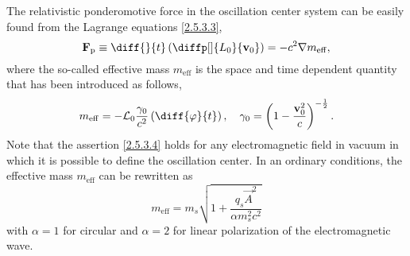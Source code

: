 The relativistic ponderomotive force in the oscillation center system can be easily found from the Lagrange equations \ref{2.5.3.3},
\begin{equation}
\vec{F}_{\mathrm{p}} \equiv \diff{}{t} \left( \diffp[]{L_0}{\vec{v}_0} \right) = -c^2 \grad{m_{\mathrm{eff}}},
\end{equation}
where the so-called effective mass $ m_{\mathrm{eff}} $ is the space and time dependent quantity that has been introduced as follows,
\begin{equation}
\label{2.5.3.4}
m_{\mathrm{eff}} = - \mathcal{L}_0 \frac{\gamma_0}{c^2} \left( \diff{\varphi}{t} \right), \quad  \gamma_0 = \left(1 - \frac{\vec{v}_0^{2}}{c} \right)^{-\frac{1}{2}}.
\end{equation}
Note that the assertion \ref{2.5.3.4} holds for any electromagnetic field in vacuum in which it is possible to define the oscillation center. In an ordinary conditions, the effective mass $ m_{\mathrm{eff}} $ can be rewritten as
\begin{equation}
m_{\mathrm{eff}} = m_s \sqrt{1 + \frac{q_s \vec{A}^2}{\alpha m_s^2 c^2}}
\end{equation}
with $ \alpha = 1 $ for circular and $ \alpha = 2 $ for linear polarization of the electromagnetic wave. 